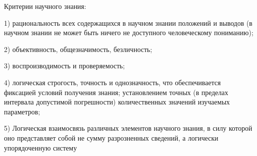 \documentclass[exam_answers.tex]{subfiles}
\begin{document}
Критерии научного знания:

1) рациональность всех содержащихся в научном знании положений и выводов (в научном знании не может быть ничего не доступного человеческому пониманию);

2) объективность, общезначимость, безличность;

3) воспроизводимость и проверяемость;

4) логическая строгость, точность и однозначность, что обеспечивается фиксацией условий получения знания; установлением точных (в пределах интервала допустимой погрешности) количественных значений изучаемых параметров;

5) Логическая взаимосвязь различных элементов научного знания, в силу которой оно представляет собой не сумму разрозненных сведений, а логически упорядоченную систему
\end{document}

